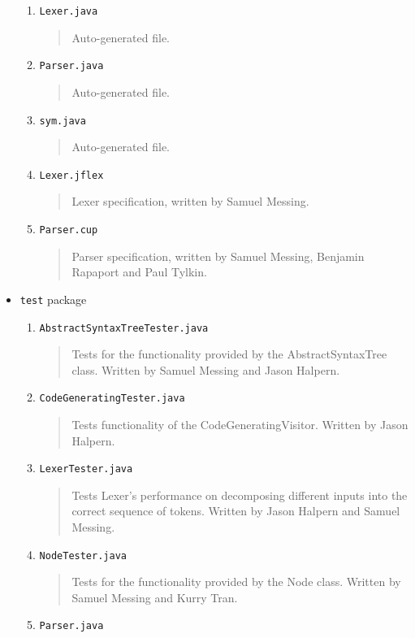 \documentclass{report}
\begin{document}
\begin{itemize}
\begin{enumerate}
\item \texttt{Lexer.java}
\begin{quotation}
\noindent Auto-generated file.
\end{quotation}
\item \texttt{Parser.java}
\begin{quotation}
\noindent Auto-generated file. 
\end{quotation}
\item \texttt{sym.java}
\begin{quotation}
\noindent Auto-generated file. 
\end{quotation}
\item \texttt{Lexer.jflex}
\begin{quotation}
\noindent Lexer specification, written by Samuel Messing. 
\end{quotation}
\item \texttt{Parser.cup} 
\begin{quotation}
\noindent Parser specification, written by Samuel Messing, Benjamin Rapaport and Paul Tylkin. 
\end{quotation}
\end{enumerate} %
\item \texttt{test} package
\begin{enumerate}
\item \texttt{AbstractSyntaxTreeTester.java}
\begin{quotation}
\noindent Tests for the functionality provided by the AbstractSyntaxTree class. Written by Samuel Messing and Jason Halpern. 
\end{quotation}
\item \texttt{CodeGeneratingTester.java}
\begin{quotation}
\noindent Tests functionality of the CodeGeneratingVisitor. Written by Jason Halpern. 
\end{quotation}
\item \texttt{LexerTester.java}
\begin{quotation}
\noindent Tests Lexer's performance on decomposing different inputs into the correct
 sequence of tokens. Written by Jason Halpern and Samuel Messing. 
\end{quotation}
\item \texttt{NodeTester.java}
\begin{quotation}
\noindent Tests for the functionality provided by the Node class. Written by Samuel Messing and Kurry Tran. 
\end{quotation}
\item \texttt{Parser.java}

\end{enumerate}
\end{itemize}
\end{document}
